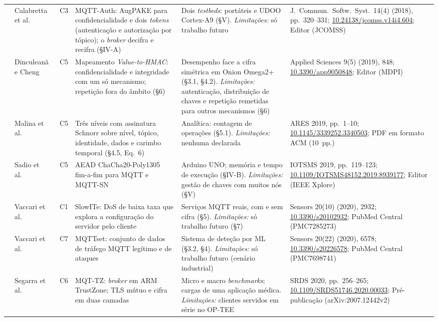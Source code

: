 {\begin{longtable}{@{}lL{2.2cm}cL{4.4cm}L{3.0cm}L{3.6cm}@{}}
 & Calabretta et al.~\cite{calabretta2018mqttauth} & C3 &
  MQTT-Auth: AugPAKE para confidencialidade e dois \emph{tokens} (autenticação e autorização por tópico); o \emph{broker} decifra e recifra (§IV-A) & Dois \emph{testbeds}: portáteis e UDOO Cortex-A9 (§V). \textit{Limitações:} só trabalho futuro & J.\ Commun.\ Softw.\ Syst.\ 14(4) (2018), pp.~320--331; \url{10.24138/jcomss.v14i4.604}; Editor (JCOMSS) \\
 & Dinculeană e Cheng~\cite{dinculeana2019vulnerabilities} & C5 &
  Mapeamento \emph{Value-to-HMAC}: confidencialidade e integridade com um só mecanismo; repetição fora do âmbito (§6) & Desempenho face a cifra simétrica em Onion Omega2+ (§3.1, §4.2). \textit{Limitações:} autenticação, distribuição de chaves e repetição remetidas para outros mecanismos (§6) & Applied Sciences 9(5) (2019), 848; \url{10.3390/app9050848}; Editor (MDPI) \\
 & Malina et al.~\cite{malina2019secure} & C5 &
  Três níveis com assinatura Schnorr sobre nível, tópico, identidade, dados e carimbo temporal (§4.5, Eq.~6) & Analítica: contagem de operações (§5.1). \textit{Limitações:} nenhuma declarada & ARES 2019, pp.~1--10; \url{10.1145/3339252.3340503}; PDF em formato ACM (10~pp.) \\
 & Sadio et al.~\cite{sadio2019lightweight} & C5 &
  AEAD ChaCha20-Poly1305 fim-a-fim para MQTT e MQTT-SN & Arduino UNO; memória e tempo de execução (§IV-B). \textit{Limitações:} gestão de chaves com muitos nós (§V) & IOTSMS 2019, pp.~119--123; \url{10.1109/IOTSMS48152.2019.8939177}; Editor (IEEE Xplore) \\
 & Vaccari et al.~\cite{vaccari2020slowite} & C1 &
  SlowITe: DoS de baixa taxa que explora a configuração do servidor pelo cliente & Serviços MQTT reais, com e sem cifra (§5). \textit{Limitações:} só trabalho futuro (§7) & Sensors 20(10) (2020), 2932; \url{10.3390/s20102932}; PubMed Central (PMC7285273) \\
 & Vaccari et al.~\cite{vaccari2020mqttset} & C7 &
  MQTTset: conjunto de dados de tráfego MQTT legítimo e de ataques & Sistema de deteção por ML (§3.2, §4). \textit{Limitações:} só trabalho futuro (cenário industrial) & Sensors 20(22) (2020), 6578; \url{10.3390/s20226578}; PubMed Central (PMC7698741) \\
 & Segarra et al.~\cite{segarra2020mqttz} & C6 &
  MQT-TZ: \emph{broker} em ARM TrustZone; TLS mútuo e cifra em duas camadas & Micro e macro \emph{benchmarks}; cargas de uma aplicação médica. \textit{Limitações:} clientes servidos em série no OP-TEE & SRDS 2020, pp.~256--265; \url{10.1109/SRDS51746.2020.00033}; Pré-publicação (arXiv:2007.12442v2) \\

\end{longtable}}

